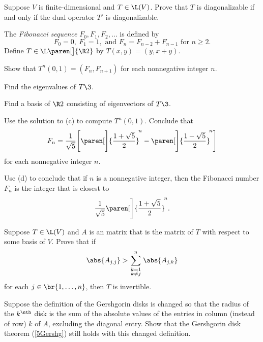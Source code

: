 \exercise
Suppose $V$ is finite-dimensional and $T \in \L(V)$. Prove that $T$ is diagonalizable if and only if the dual operator $T'$ is diagonalizable.


\exercise
The \emph{Fibonacci sequence} $F_0, F_1, F_2, \dots$ is defined by \label{Fibonacci}
\[
F_0 = 0,\ F_1 = 1, \text{ and }F_n = F_{n-2} + F_{n-1} \text{\ for\ } n \ge 2.
\]
Define $T \in \L\paren[\big]{\R2}$ by $T(x, y) = (y, x+y)$.
\begin{subtheorem}
\item
Show that $T^n(0, 1) = (F_n, F_{n+1})$ for each nonnegative integer $n$.
\item
Find the eigenvalues of $T\3$.
\item
Find a basis of $\R2$ consisting of eigenvectors of $T\3$.
\item
Use the solution to (c) to compute $T^n(0, 1)$. Conclude that
\[
F_n = \frac{1}{\sqrt{5}} \Biggl[ \paren[\Bigg]{ \frac{1 + \sqrt{5}}{2} }^{\!n}
-\paren[\Bigg]{ \frac{1 - \sqrt{5}}{2} }^{\!n} \Biggr]
\]
for each nonnegative integer $n$.
\item
Use (d) to conclude that if $n$ is a nonnegative integer, then the Fibonacci number $F_n$ is the integer that is closest to
\[
\frac{1}{\sqrt{5}}  \paren[\Bigg]{ \frac{1 + \sqrt{5}}{2} }^{\!n}.
\]
\end{subtheorem}


\exercise
Suppose $T \in \L(V)$ and $A$ is an  matrix that is the matrix of $T$ with respect to some basis of $V$. Prove that if
\[
\abs{ A_{j,j} } > \sum_{\scriptstyle k=1 \atop \scriptstyle k\ne j}^n \abs{A_{j,k}}
\]
for each $j \in \br{1, \ldots, n}$, then $T$ is invertible.\label{5Gershgor}


\exercise
Suppose the definition of the Gershgorin disks is changed so that the radius of the $k^\nth$ disk is the sum of the absolute values of the entries in column (instead of row) $k$ of $A$, excluding the diagonal entry. Show that the Gershgorin disk theorem (\ref{5Gershg}) still holds with this changed definition.\label{5Gershgo}


